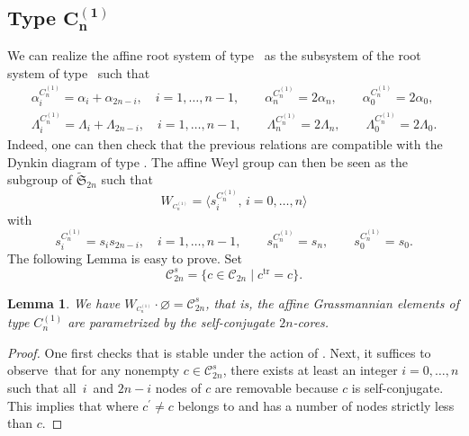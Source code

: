\documentclass[10pt,a4paper]{amsart}
\newtheorem{Lemma}[Theorem]{Lemma}
\numberwithin{equation}{section}
\begin{document}
\subsection[Type C\_n\^{}(1)]{Type $\boldsymbol{C_{n}^{(1)}}$}

We can realize the affine root system of type~ as the subsystem
of the root system of type~ such that
\begin{gather}
\alpha _{i}^{C_{n}^{(1)}}=\alpha _{i}+\alpha _{2n-i}, \quad i=1,\dots ,n-1 ,\qquad
\alpha _{n}^{C_{n}^{(1)}}=2\alpha _{n}, \qquad
\alpha _{0}^{C_{n}^{(1)}}=2\alpha _{0},\nonumber\\
\Lambda _{i}^{C_{n}^{(1)}}=\Lambda _{i}+\Lambda _{2n-i}, \quad i=1,\dots ,n-1, \qquad
\Lambda _{n}^{C_{n}^{(1)}}=2\Lambda _{n} ,\qquad
\Lambda _{0}^{C_{n}^{(1)}}=2\Lambda _{0}.
  \label{RelC}
\end{gather}
Indeed, one can then check that the previous relations are compatible with
the Dynkin diagram of type . The affine Weyl group  can then be seen as the subgroup of $\widetilde{
	\mathfrak{S}}_{2n}$ such that
\[
W_{^{C_{n}^{(1)}}}=\bigl\langle s_{i}^{C_{n}^{(1)}},\, i=0,\dots ,n\bigr\rangle
\]
with
\[
s_{i}^{C_{n}^{(1)}}=s_{i}s_{2n-i},\quad i=1,\dots ,n-1, \qquad
s_{n}^{C_{n}^{(1)}}=s_{n}, \qquad
s_{0}^{C_{n}^{(1)}}=s_{0}.
\]
The following Lemma is easy to prove. Set
\begin{equation*}
\mathcal{C}_{2n}^{s}=\bigl\{c\in \mathcal{C}_{2n}\mid c^{\mathrm{tr}}=c \bigr\}.
\end{equation*}

\begin{Lemma}
	\label{Lemma_selfconjugate}We have $W_{^{C_{n}^{(1)}}}\cdot \varnothing =
	\mathcal{C}_{2n}^{s}$, that is, the affine Grassmannian elements of type $
	C_{n}^{(1)}$ are parametrized by the self-conjugate $2n$-cores.
\end{Lemma}

\begin{proof}
	One first checks that  is stable under the action of .
    Next, it suffices to ob\-serve~that for any nonempty $%
	c\in \mathcal{C}_{2n}^{s}$, there exists at least an integer $i=0,\dots ,n$
	such that all~$i$~and $2n-i$ nodes of $c$ are removable because $c$
	is self-conjugate. This implies that 
    where $c^{\prime }\neq c$ belongs to  and has a
	number of nodes strictly less than $c$.
\end{proof}
\end{document}

